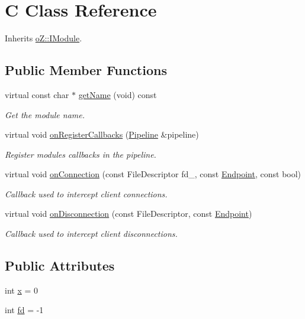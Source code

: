 \hypertarget{class_c}{}\section{C Class Reference}
\label{class_c}


Inherits \mbox{\hyperlink{classo_z_1_1_i_module}{o\+Z\+::\+I\+Module}}.

\subsection*{Public Member Functions}
\begin{DoxyCompactItemize}
\item 
virtual const char $\ast$ \mbox{\hyperlink{class_c_ad5f4b90909e9c14fc2601adc54ffdfa6}{get\+Name}} (void) const
\begin{DoxyCompactList}\small\item\em Get the module name. \end{DoxyCompactList}\item 
virtual void \mbox{\hyperlink{class_c_ae55c5d0571aadf7e48cae4d1e4fcf591}{on\+Register\+Callbacks}} (\mbox{\hyperlink{classo_z_1_1_pipeline}{Pipeline}} \&pipeline)
\begin{DoxyCompactList}\small\item\em Register module\textquotesingle{}s callbacks in the pipeline. \end{DoxyCompactList}\item 
virtual void \mbox{\hyperlink{class_c_a9d2de0b00320ee2011d7e326346d00cb}{on\+Connection}} (const File\+Descriptor fd\+\_\+, const \mbox{\hyperlink{classo_z_1_1_endpoint}{Endpoint}}, const bool)
\begin{DoxyCompactList}\small\item\em Callback used to intercept client connections. \end{DoxyCompactList}\item 
virtual void \mbox{\hyperlink{class_c_ab9bef2875c2d19d674aa592f63a21bc1}{on\+Disconnection}} (const File\+Descriptor, const \mbox{\hyperlink{classo_z_1_1_endpoint}{Endpoint}})
\begin{DoxyCompactList}\small\item\em Callback used to intercept client disconnections. \end{DoxyCompactList}\end{DoxyCompactItemize}
\subsection*{Public Attributes}
\begin{DoxyCompactItemize}
\item 
int \mbox{\hyperlink{class_c_a644bc4405a602578b65e83d317a2f3eb}{x}} = 0
\item 
int \mbox{\hyperlink{class_c_a7d63b9c907f2a1200cd3e173cee9751e}{fd}} = -\/1
\end{DoxyCompactItemize}
